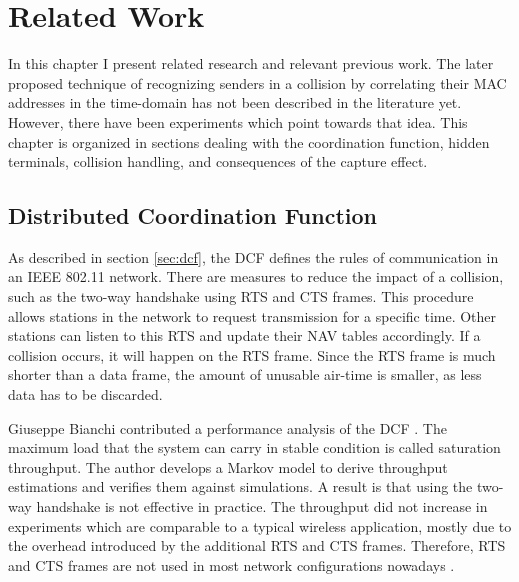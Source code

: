 
\chapter{Related Work}\label{ch:relatedwork}
\glsresetall %
 

In this chapter I present related research and relevant previous work. The later proposed technique of recognizing senders in a collision by correlating their \gls{MAC} addresses in the time-domain has not been described in the literature yet. However, there have been experiments which point towards that idea. This chapter is organized in sections dealing with the coordination function, hidden terminals, collision handling, and consequences of the capture effect.



\section{Distributed Coordination Function}\label{sec:related-dcf}

As described in section \ref{sec:dcf}, the \gls{DCF} defines the rules of communication in an IEEE 802.11 network. There are measures to reduce the impact of a collision, such as the two-way handshake using \gls{RTS} and \gls{CTS} frames. This procedure allows stations in the network to request transmission for a specific time. Other stations can listen to this \gls{RTS} and update their \gls{NAV} tables accordingly. If a collision occurs, it will happen on the \gls{RTS} frame. Since the \gls{RTS} frame is much shorter than a data frame, the amount of unusable air-time is smaller, as less data has to be discarded.

Giuseppe Bianchi contributed a performance analysis of the \gls{DCF} \cite{bianchi2000}. The maximum load that the system can carry in stable condition is called saturation throughput. The author develops a Markov model to derive throughput estimations and verifies them against simulations. A result is that using the two-way handshake is not effective in practice. The throughput did not increase in experiments which are comparable to a  typical wireless application, mostly due to the overhead introduced by the additional \gls{RTS} and \gls{CTS} frames. Therefore, \gls{RTS} and \gls{CTS} frames are not used in most network configurations nowadays \cite{bianchi2000, gollakota2008, choi2013}.\\

